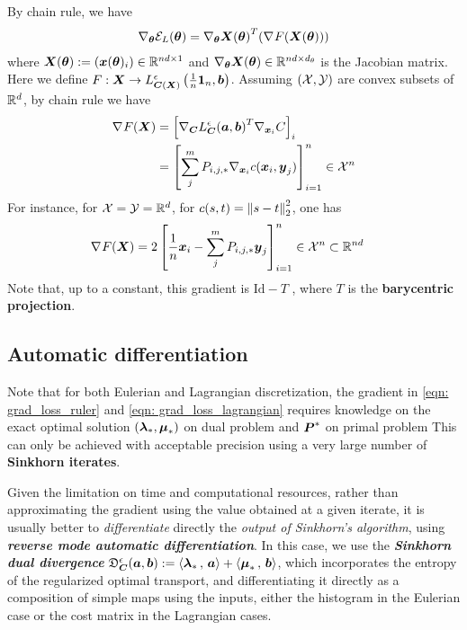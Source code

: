 \documentclass[11pt]{article}
\begin{document}
\begin{itemize}
By chain rule, we have
\begin{align}
\nabla_{\boldsymbol{\theta}}{{\mathcal E}_{L}(\boldsymbol{\theta})} = \nabla_{\boldsymbol{\theta}}{\boldsymbol{X}(\boldsymbol{\theta})}^{T}(\nabla_{}{F(\boldsymbol{X}(\boldsymbol{\theta}))}) \label{eqn: grad_loss_lagrangian}
\end{align} where $\boldsymbol{X}(\boldsymbol{\theta}):= (\boldsymbol{x}(\boldsymbol{\theta})_i) \in {\mathbb R}^{nd \times 1}$ and  $\nabla_{\boldsymbol{\theta}}{\boldsymbol{X}(\boldsymbol{\theta})} \in {\mathbb R}^{nd \times  d_{\theta} }$ is the Jacobian matrix.
Here we define 
$F: \boldsymbol{X} \rightarrow L_{\boldsymbol{C}(\boldsymbol{X})}^{\epsilon}\left(\frac{1}{n}\boldsymbol{1}_{n}, \boldsymbol{b}\right)$. Assuming $({\mathcal X} , {\mathcal Y})$ are convex subsets of ${\mathbb R}^d$, by chain rule we have 
\begin{align}
\nabla_{}{F(\boldsymbol{X})} &=\left[\nabla_{\boldsymbol{C}}{L_{\boldsymbol{C}}^{\epsilon}(\boldsymbol{a}, \boldsymbol{b})}^T \nabla_{\boldsymbol{x}_{i}}{C}\right]_{i}\nonumber\\
&= \left[\sum_{j}^{m}P_{i,j, *} \nabla_{\boldsymbol{x}_{i}}{c(\boldsymbol{x}_{i}, \boldsymbol{y}_{j})} \right]_{i=1}^{n} \in {\mathcal X}^{n}  \label{eqn: grad_loss_cost}
\end{align} For instance, for ${\mathcal X} = {\mathcal Y} = {\mathbb R}^d$, for $c(s, t) = \left\|s - t\right\|_{2}^2$, one has 
\begin{align}
\nabla_{}{F(\boldsymbol{X})} &= 2\left[\frac{1}{n}\boldsymbol{x}_{i} - \sum_{j}^{m}P_{i,j, *}\boldsymbol{y}_{j}\right]_{i=1}^{n} \in {\mathcal X}^{n} \subset {\mathbb R}^{nd}  \label{eqn: grad_loss_cost_eu}
\end{align} Note that, up to a constant, this gradient is $\text{Id} - T$ , where $T$ is the \textbf{barycentric projection}.
\end{itemize}

\subsection{Automatic differentiation}
Note that for both Eulerian and Lagrangian discretization, the gradient in \eqref{eqn: grad_loss_ruler} and \eqref{eqn: grad_loss_lagrangian} requires knowledge on the exact optimal solution $(\boldsymbol{\lambda}_{*}, \boldsymbol{\mu}_{*})$ on dual problem and  $\boldsymbol{P}^{*}$ on primal problem  This can only be achieved with acceptable precision using a very large number of \textbf{Sinkhorn iterates}. 

Given the limitation on time and computational resources, rather than approximating the gradient using the value obtained at a given iterate, it is usually better to \emph{differentiate} directly the \emph{output of Sinkhorn’s algorithm}, using \emph{\textbf{reverse mode automatic differentiation}}. In this case, we use the \textbf{\emph{Sinkhorn dual divergence}} $\mathfrak{D}_{\boldsymbol{C}}^{\epsilon}(\boldsymbol{a}, \boldsymbol{b}) :=\left\langle \boldsymbol{\lambda}_{*}\,,\, \boldsymbol{a} \right\rangle + \left\langle \boldsymbol{\mu}_{*}\,,\, \boldsymbol{b} \right\rangle$, which incorporates the entropy of the regularized optimal transport, and differentiating it directly as a composition of simple maps using the inputs, either the histogram in the Eulerian case or the cost matrix in the Lagrangian cases. 
\end{document}
